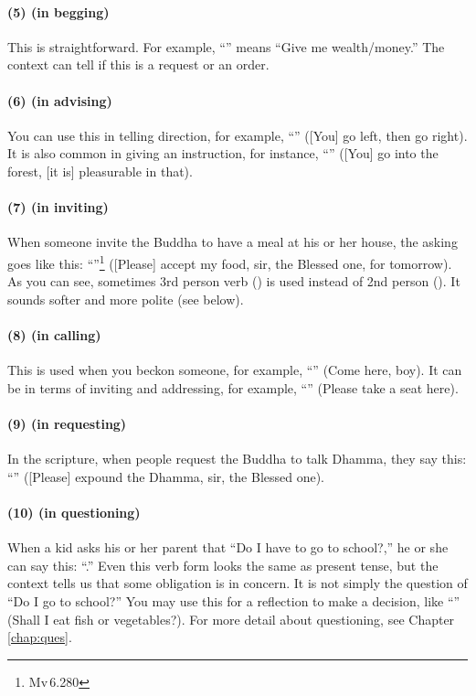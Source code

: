 \paragraph*{(5)  (in begging)} This is straightforward. For example, ``'' means ``Give me wealth/money.'' The context can tell if this is a request or an order.

\paragraph*{(6)  (in advising)} You can use this in telling direction, for example, ``'' ([You] go left, then go right). It is also common in giving an instruction, for instance, ``'' ([You] go into the forest, [it is] pleasurable in that).

\paragraph*{(7)  (in inviting)} When someone invite the Buddha to have a meal at his or her house, the asking goes like this: ``''\footnote{Mv\,6.280} ([Please] accept my food, sir, the Blessed one, for tomorrow). As you can see, sometimes 3rd person verb () is used instead of 2nd person (). It sounds softer and more polite (see below).

\paragraph*{(8)  (in calling)} This is used when you beckon someone, for example, ``'' (Come here, boy). It can be in terms of inviting and addressing, for example, ``'' (Please take a seat here).

\paragraph*{(9)  (in requesting)} In the scripture, when people request the Buddha to talk Dhamma, they say this: ``'' ([Please] expound the Dhamma, sir, the Blessed one).

\paragraph*{(10)  (in questioning)} When a kid asks his or her parent that ``Do I have to go to school?,'' he or she can say this: ``.'' Even this verb form looks the same as present tense, but the context tells us that some obligation is in concern. It is not simply the question of ``Do I go to school?'' You may use this for a reflection to make a decision, like ``'' (Shall I eat fish or vegetables?). For more detail about questioning, see Chapter \ref{chap:ques}.

